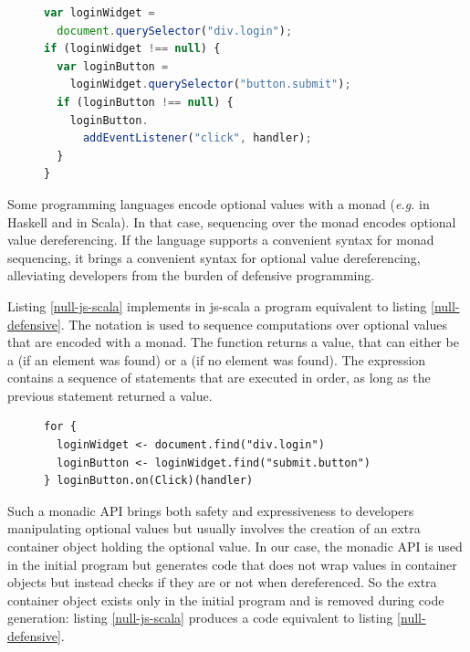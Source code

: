 \documentclass[preprint]{sigplanconf}
\newcommand{\eg}{\emph{e.g.}}
\begin{document}
\begin{figure}
\begin{lstlisting}[language=JavaScript,label=null-defensive,caption=Defensive programming to handle
null references,captionpos=b]
var loginWidget =
  document.querySelector("div.login");
if (loginWidget !== null) {
  var loginButton =
    loginWidget.querySelector("button.submit");
  if (loginButton !== null) {
    loginButton.
      addEventListener("click", handler);
  }
}
\end{lstlisting}
\end{figure}

Some programming languages encode optional values with a monad (\eg {} in Haskell and
 in Scala). In that case, sequencing over the monad encodes optional value
dereferencing. If the language supports a convenient syntax for monad sequencing, it brings a
convenient syntax for optional value dereferencing, alleviating developers from the burden of
defensive programming.

Listing \ref{null-js-scala} implements in js-scala a program equivalent to listing
\ref{null-defensive}. The  notation is used to sequence computations over optional values
that are encoded with a monad. The  function returns a  value,
that can either be a  (if an element was found) or a 
(if no element was found). The  expression contains a sequence of statements that are
executed in order, as long as the previous statement returned a  value.

\begin{figure}
\begin{lstlisting}[label=null-js-scala,caption=Handling null references in js-scala,captionpos=b]
for {
  loginWidget <- document.find("div.login")
  loginButton <- loginWidget.find("submit.button")
} loginButton.on(Click)(handler)
\end{lstlisting}
\end{figure}

Such a monadic API brings both safety and expressiveness to developers manipulating optional values
but usually involves the creation of an extra container object holding the optional value. In our
case, the monadic API is used in the initial program but generates code that does not wrap values in
container objects but instead checks if they are  or not when dereferenced. So the extra
container object exists only in the initial program and is removed during code generation: listing
\ref{null-js-scala} produces a code equivalent to listing
\ref{null-defensive}.
\end{document}
